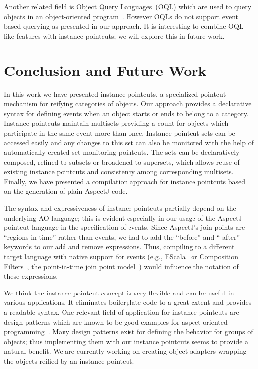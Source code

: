 \documentclass{acm_proc_article-sp}
\begin{document}
Another related field is Object Query Languages~(OQL) which are used to query objects in an object-oriented program~\cite{cluet1998designing}. However OQLs do not support event based querying as presented in our approach. It is interesting to combine  OQL like features with instance pointcuts; we will explore this in future work. 


\section{Conclusion and Future Work}
In this work we have presented instance pointcuts, a specialized pointcut mechanism for reifying categories of objects. Our approach provides a declarative syntax for defining events when an object starts or ends to belong to a category. Instance pointcuts maintain multisets providing a count for objects which participate in the same event more than once. Instance pointcut sets can be accessed easily and any changes to this set can also be monitored with the help of automatically created set monitoring pointcuts. The sets can be declaratively composed, refined to subsets or broadened to supersets, which allows reuse of existing instance pointcuts and consistency among corresponding multisets. Finally, we have presented a compilation approach for instance pointcuts based on the generation of plain AspectJ code.

The syntax and expressiveness of instance pointcuts partially depend on the underlying AO language; this is evident especially in our usage of the AspectJ pointcut language in the specification of events. Since AspectJ's join points are ``regions in time'' rather than events, we had to add the ``before'' and `` after'' keywords to our add and remove expressions. Thus, compiling to a different target language with native support for events (e.g., EScala~\cite{Gasiunas2011} or Composition
Filters~\cite{Bergmans2001b}, the point-in-time join point model~\cite{masuharafine}) would influence the notation of these expressions.

We think the instance pointcut concept is very flexible and can be useful in various applications. It eliminates boilerplate code to a great extent and provides a readable syntax. One relevant field of application for instance pointcuts are design patterns which are known to be good examples for aspect-oriented programming~\cite{hannemann:oopsla02}. Many design patterns exist for defining the behavior for groups of objects; thus implementing them with our instance pointcuts seems to provide a natural benefit. We are currently working on creating object adapters wrapping the objects reified by an instance pointcut.




\end{document}
